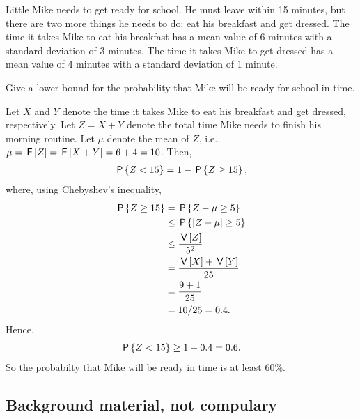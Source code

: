 Little Mike needs to get ready for school. He must leave within 15 minutes, but there are two more things he needs to do: eat his breakfast and get dressed. The time it takes Mike to eat his breakfast has a mean value of 6 minutes with a standard deviation of 3 minutes. The time it takes Mike to get dressed has a mean value of 4 minutes with a standard deviation of 1 minute.
\begin{exercise}
Give a lower bound for the probability that Mike will be ready for school in time.
\begin{solution}
Let $X$ and $Y$ denote the time it takes Mike to eat his breakfast and get dressed, respectively. Let $Z = X + Y$ denote the total time Mike needs to finish his morning routine. Let $\mu$ denote the mean of $Z$, i.e., $\mu = \E{Z} = \E{X+Y} = 6+4 = 10$. Then,
\begin{align}
    \P{Z < 15} = 1 - \P{Z \geq 15},
\end{align}
where, using Chebyshev's inequality,
\begin{align}
  \P{Z \geq 15} &= \P{Z - \mu \geq 5} \\
  &\leq \P{|Z - \mu| \geq 5} \\
  &\leq \frac{\V{Z}}{5^2} \\
  &= \frac{\V{X} + \V{Y}}{25} \\
  &= \frac{9 + 1}{25} \\
  &= 10/25 = 0.4.
\end{align}
Hence,
\begin{align}
    \P{Z < 15} \geq 1 - 0.4 = 0.6.
\end{align}
So the probabilty that Mike will be ready in time is at least 60\%.
\end{solution}
\end{exercise}


\subsection{Background material, not compulary}
\label{sec:backgr-mater-not}


